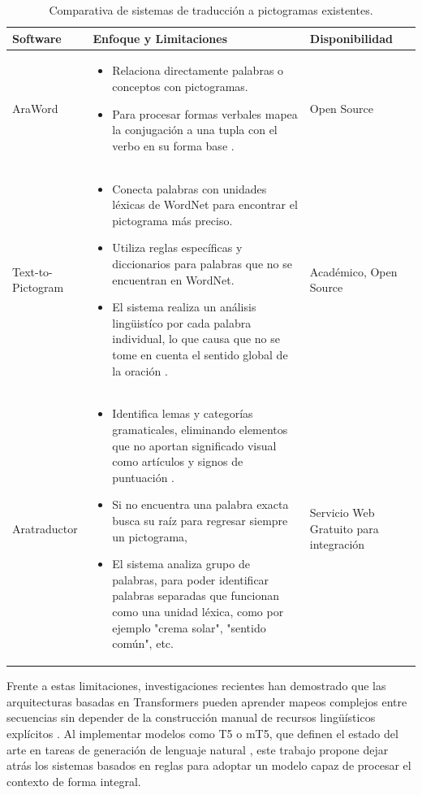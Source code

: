 \documentclass[10pt,letterpaper]{article}
\begin{document}
\begin{table}[H]
\centering
\small
\begin{tabular}{|l|p{8cm}|p{2cm}|}
\hline
\textbf{Software} & \textbf{Enfoque y Limitaciones} & \textbf{Disponibilidad} \\ \hline
AraWord & \begin{itemize}[noitemsep, topsep=0pt]\item Relaciona directamente palabras o conceptos con pictogramas.
    \item Para procesar formas verbales mapea la conjugación a una tupla con el verbo en su forma base \autocite{perez2011}.
\end{itemize} & Open Source \\ \hline
Text-to-Pictogram  & \begin{itemize}[noitemsep, topsep=0pt]
\item Conecta palabras con unidades léxicas de WordNet para encontrar el pictograma más preciso.
\item Utiliza reglas específicas y diccionarios para palabras que no se encuentran en WordNet.
\item El sistema realiza un análisis lingüistíco por cada palabra individual, lo que causa que no se tome en cuenta el sentido global de la oración \autocite{vandeghinste2016}. 

\end{itemize} & Académico, Open Source \\ \hline
Aratraductor & \begin{itemize}[noitemsep, topsep=0pt]
    \item Identifica lemas y categorías gramaticales, eliminando elementos que no aportan significado visual como artículos y signos de puntuación \autocite{gervas2017}.
    \item Si no encuentra una palabra exacta busca su raíz para regresar siempre un pictograma,
    \item El sistema analiza grupo de palabras, para poder identificar palabras separadas que funcionan como una unidad léxica, como por ejemplo "crema solar", "sentido común", etc. 
\end{itemize} & Servicio Web Gratuito para integración \\ \hline
\end{tabular}
\caption{Comparativa de sistemas de traducción a pictogramas existentes.}
\label{tab:comparativa}
\end{table}

Frente a estas limitaciones, investigaciones recientes han demostrado que las arquitecturas basadas en Transformers pueden aprender mapeos complejos entre secuencias  sin depender de la construcción manual de recursos lingüísticos explícitos \cite{vaswani2017}. Al implementar modelos como T5 o mT5, que definen el estado del arte en tareas de generación de lenguaje natural \cite{raffel2020}, este trabajo propone dejar atrás los sistemas basados en reglas para adoptar un modelo  capaz de procesar el contexto de forma integral.
\end{document}
